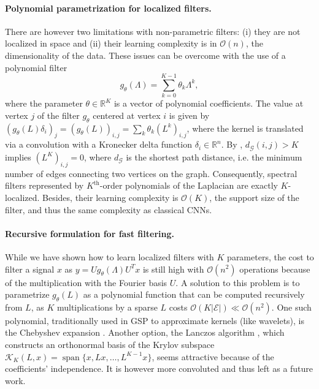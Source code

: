 \documentclass{article}
\DeclareMathOperator*{\spn}{span}
\newcommand{\G}{\mathcal{G}}
\newcommand{\E}{\mathcal{E}}
\newcommand{\bO}{\mathcal{O}}
\newcommand{\R}{\mathbb{R}}
\begin{document}
\paragraph{Polynomial parametrization for localized filters.} There are however
two limitations with non-parametric filters: (i) they are not localized in
space and (ii) their learning complexity is in $\bO(n)$, the dimensionality of
the data. These issues can be overcome with the use of a polynomial filter
\begin{equation} \label{eq:filt_poly}
	g_\theta(\Lambda) = \sum_{k=0}^{K-1} \theta_k \Lambda^k,
\end{equation}
where the parameter $\theta \in \R^K$ is a vector of polynomial coefficients.
The value at vertex $j$ of the filter $g_\theta$ centered at vertex $i$ is
given by $(g_\theta(L) \delta_i)_j = (g_\theta(L))_{i,j} = \sum_k \theta_k
(L^k)_{i,j}$, where the kernel is translated via a convolution with a Kronecker
delta function $\delta_i \in \R^n$. By \cite[Lemma
5.2]{art:HammondVandergheynstGribonval11GraphWav}, $d_\G(i,j) > K$ implies
$(L^K)_{i,j} = 0$, where $d_\G$ is the shortest path distance, i.e. the minimum
number of edges connecting two vertices on the graph.  Consequently, spectral
filters represented by $K^\text{th}$-order polynomials of the Laplacian are
exactly $K$-localized. Besides, their learning complexity is $\bO(K)$, the
support size of the filter, and thus the same complexity as classical CNNs.

\paragraph{Recursive formulation for fast filtering.} While we have shown how
to learn localized filters with $K$ parameters, the cost to filter a signal $x$
as $y = Ug_\theta(\Lambda)U^Tx$ is still high with $\bO(n^2)$ operations
because of the multiplication with the Fourier basis $U$. A solution to this
problem is to parametrize $g_\theta(L)$ as a polynomial function that can be
computed recursively from $L$, as $K$ multiplications by a sparse $L$ costs
$\bO(K|\E|) \ll \bO(n^2)$. One such polynomial, traditionally used in GSP to
approximate kernels (like wavelets), is the Chebyshev expansion
\cite{art:HammondVandergheynstGribonval11GraphWav}. Another option, the Lanczos
algorithm \cite{art:SusnjaraPerraudinKressnerVandergheynst15Lanczos}, which
constructs an orthonormal basis of the Krylov subspace $\mathcal{K}_K(L,x) =
\spn\{x,Lx,\ldots,L^{K-1}x\}$, seems attractive because of the coefficients'
independence. It is however more convoluted and thus left as a future work.
\end{document}
